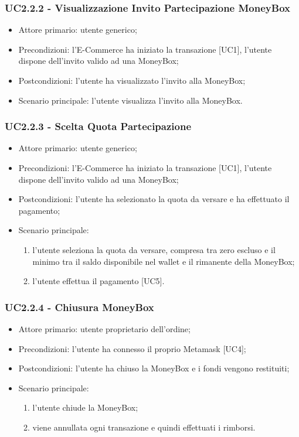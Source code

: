     \subsubsection{UC2.2.2 - Visualizzazione Invito Partecipazione MoneyBox}

    \begin{itemize}
    \item Attore primario: utente generico;
    \item Precondizioni: l'E-Commerce ha iniziato la transazione [UC1], l'utente dispone dell'invito valido ad una MoneyBox;
    \item Postcondizioni: l'utente ha visualizzato l'invito alla MoneyBox;
    \item Scenario principale: l'utente visualizza l'invito alla MoneyBox.
    \end{itemize}

    \subsubsection{UC2.2.3 - Scelta Quota Partecipazione}

    \begin{itemize}
    \item Attore primario: utente generico;
    \item Precondizioni: l'E-Commerce ha iniziato la transazione [UC1], l'utente dispone dell'invito valido ad una MoneyBox;
    \item Postcondizioni: l'utente ha selezionato la quota da versare e ha effettuato il pagamento;
    \item Scenario principale:
    \begin{enumerate}
        \item l'utente seleziona la quota da versare, compresa tra zero escluso e il minimo tra il saldo disponibile nel wallet e il rimanente della MoneyBox;
        \item l'utente effettua il pagamento [UC5].
    \end{enumerate}
    \end{itemize}

    \subsubsection{UC2.2.4 - Chiusura MoneyBox}

    \begin{itemize}
    \item Attore primario: utente proprietario dell'ordine;
    \item Precondizioni: l'utente ha connesso il proprio Metamask [UC4];
    \item Postcondizioni: l'utente ha chiuso la MoneyBox e i fondi vengono restituiti;
    \item Scenario principale:
    \begin{enumerate}
        \item l'utente chiude la MoneyBox;
        \item viene annullata ogni transazione e quindi effettuati i rimborsi.
    \end{enumerate}
    \end{itemize}


